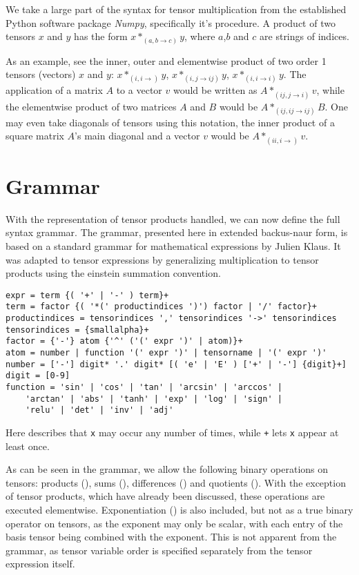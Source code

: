\documentclass[12pt, a4paper]{report}
\begin{document}
We take a large part of the syntax for tensor multiplication from the established Python software package \textit{Numpy}, specifically it's  procedure.
A product of two tensors $x$ and $y$ has the form $x*_{(a,b \rightarrow c)}y$, where $a$,$b$ and $c$ are strings of indices.

As an example, see the inner, outer and elementwise product of two order 1 tensors (vectors) $x$ and $y$: $x*_{(i,i \rightarrow)}y$, $x*_{(i,j \rightarrow ij)}y$, $x*_{(i,i \rightarrow i)}y$.
The application of a matrix $A$ to a vector $v$ would be written as $A*_{(ij,j \rightarrow i)}v$, while the elementwise product of two matrices $A$ and $B$ would be $A*_{(ij,ij \rightarrow ij)}B$.
One may even take diagonals of tensors using this notation, the inner product of a square matrix $A$'s main diagonal and a vector $v$ would be $A*_{(ii,i \rightarrow)}v$.


\section{Grammar}
With the representation of tensor products handled, we can now define the full syntax grammar.
The grammar, presented here in extended backus-naur form, is based on a standard grammar for mathematical expressions by Julien Klaus.
It was adapted to tensor expressions by generalizing multiplication to tensor products using the einstein summation convention.
\begin{verbatim}
expr = term {( '+' | '-' ) term}+
term = factor {( '*(' productindices ')') factor | '/' factor}+
productindices = tensorindices ',' tensorindices '->' tensorindices
tensorindices = {smallalpha}+
factor = {'-'} atom {'^' ('(' expr ')' | atom)}+
atom = number | function '(' expr ')' | tensorname | '(' expr ')'
number = ['-'] digit* '.' digit* [( 'e' | 'E' ) ['+' | '-'] {digit}+]
digit = [0-9]
function = 'sin' | 'cos' | 'tan' | 'arcsin' | 'arccos' | 
    'arctan' | 'abs' | 'tanh' | 'exp' | 'log' | 'sign' | 
    'relu' | 'det' | 'inv' | 'adj'
\end{verbatim}
Here \texttt{} describes that \texttt{x} may occur any number of times, while \texttt{+} lets \texttt{x} appear at least once.

As can be seen in the grammar, we allow the following binary operations on tensors: products (\codeword{*(,->)}), sums (\codeword{+}), differences (\codeword{-}) and quotients (\codeword{/}).
With the exception of tensor products, which have already been discussed, these operations are executed elementwise.
Exponentiation (\codeword{^}) is also included, but not as a true binary operator on tensors, as the exponent may only be scalar, with each entry of the basis tensor being combined with the exponent.
This is not apparent from the grammar, as tensor variable order is specified separately from the tensor expression itself.
\end{document}
